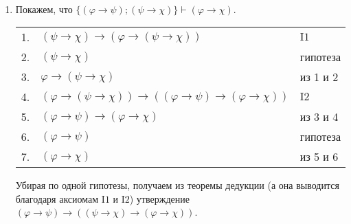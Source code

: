 \documentclass[12pt,a4paper]{article}
\begin{document}
    \begin{enumproblem}\ 
        \begin{enumerate}
            \item Покажем, что $\{(\varphi \rightarrow \psi); (\psi \rightarrow \chi)\} \vdash (\varphi \rightarrow \chi)$.
                \begin{center}
                    \begin{tabular}{rll}
                        1.& $(\psi \rightarrow \chi) \rightarrow (\varphi \rightarrow (\psi \rightarrow \chi))$& $\mathrm{I1}$\\
                        2.& $(\psi \rightarrow \chi)$& гипотеза\\
                        3.& $\varphi \rightarrow (\psi \rightarrow \chi)$& из 1 и 2\\
                        4.& $(\varphi \rightarrow (\psi \rightarrow \chi)) \rightarrow ((\varphi \rightarrow \psi) \rightarrow (\varphi \rightarrow \chi))$& $\mathrm{I2}$\\
                        5.& $(\varphi \rightarrow \psi) \rightarrow (\varphi \rightarrow \chi)$& из 3 и 4\\
                        6.& $(\varphi \rightarrow \psi)$& гипотеза\\
                        7.& $(\varphi \rightarrow \chi)$& из 5 и 6\\
                    \end{tabular}
                \end{center}
                Убирая по одной гипотезы, получаем из теоремы дедукции (а она выводится благодаря аксиомам $\mathrm{I1}$ и $\mathrm{I2}$) утверждение $(\varphi \rightarrow \psi) \rightarrow ((\psi \rightarrow \chi) \rightarrow (\varphi \rightarrow \chi))$.


\end{enumerate}
\end{enumproblem}
\end{document}
